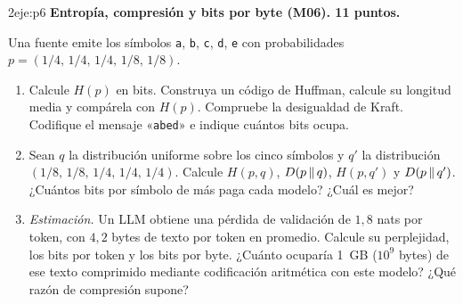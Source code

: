 \begin{ejercicio}{2}{eje:p6}
\textbf{Entropía, compresión y bits por byte (M06). 11 puntos.}

Una fuente emite los símbolos \texttt{a}, \texttt{b}, \texttt{c}, \texttt{d}, \texttt{e} con probabilidades $p=(1/4,\,1/4,\,1/4,\,1/8,\,1/8)$.
\begin{enumerate}[label=(\alph*)]
  \item {} Calcule $H(p)$ en bits. Construya un código de Huffman, calcule su longitud media y compárela con $H(p)$. Compruebe la desigualdad de Kraft. Codifique el mensaje «\texttt{abed}» e indique cuántos bits ocupa.
  \item {} Sean $q$ la distribución uniforme sobre los cinco símbolos y $q'$ la distribución $(1/8,\,1/8,\,1/4,\,1/4,\,1/4)$. Calcule $H(p,q)$, $D(p\,\|\,q)$, $H(p,q')$ y $D(p\,\|\,q')$. ¿Cuántos bits por símbolo de más paga cada modelo? ¿Cuál es mejor?
  \item {} \emph{Estimación.} Un LLM obtiene una pérdida de validación de $1{,}8$ nats por token, con $4{,}2$ bytes de texto por token en promedio. Calcule su perplejidad, los bits por token y los bits por byte. ¿Cuánto ocuparía 1~GB ($10^{9}$ bytes) de ese texto comprimido mediante codificación aritmética con este modelo? ¿Qué razón de compresión supone?
\end{enumerate}
\end{ejercicio}
